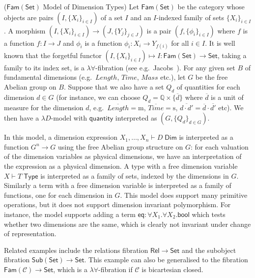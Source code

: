 \documentclass[a4paper,UKenglish]{lipics}
\newcommand{\msf}[1]{\mathsf{#1}} %
\newcommand{\Set}{\msf{Set}}
\newcommand{\Fam}[1]{\msf{Fam}(#1)}
\newcommand{\Sub}[1]{\msf{Sub}(#1)}
\newcommand{\Rel}{\msf{Rel}}
\newcommand{\C}{\mathcal{C}}
\newcommand{\bbQ}{\mathbb{Q}}
\newcommand{\qnt}{\msf{quantity}}
\newcommand{\bool}{\msf{bool}}
\newcommand{\lengthDim}{\mathit{Length}}
\newcommand{\timeDim}{\mathit{Time}}
\newcommand{\massDim}{\mathit{Mass}}
\newcommand{\Tj}[2]{#1 \vdash #2 \; \msf{ Type}}
\newcommand{\Dj}[2]{#1 \vdash #2 \; \msf{ Dim}}
\newcommand{\Dim}{D}
\newcommand{\Dvar}{X}
\begin{document}
\begin{example}($\Fam\Set$ Model of Dimension Types)
\label{example:famset}
Let $\Fam\Set$ be the category whose objects are pairs
$(I,\{X_i\}_{i\in I})$ of a set $I$ and an $I$-indexed family of sets
$\{X_i\}_{i\in I}$. A morphism $(I,\{X_i\}_{i\in I}) \to
(J,\{Y_j\}_{j\in J})$ is a pair $(f,\{\phi_i\}_{i\in I})$ where $f$ is
a function $f:I\to J$ and $\phi_i$ is a function $\phi_i:X_i\to
Y_{f(i)}$ for all $i\in I$. It is well known that the forgetful
functor $(I,\{X_i\}_{i\in I}) \mapsto I : \Fam\Set\to \Set$, taking a
family to its index set, is a $\lambda\forall$-fibration (see e.g.\
Jacobs~\cite[Lemma 1.9.5]{jacobs1999categorical}).  For any given set
$B$ of fundamental dimensions (e.g.\ $\lengthDim$, $\timeDim$, $\massDim$ etc.), let $G$ be
the free Abelian group on $B$. Suppose that we also have a set $Q_d$
of quantities for each dimension $d \in G$ (for instance, we can
choose $Q_d = \bbQ \times \{ \overline{d} \}$ where $\overline{d}$ is
a unit of measure for the dimension $d$, e.g.\
$\overline{\lengthDim} = \mathrm m$, $\overline{\timeDim} = \mathrm s$,
$\overline{d\cdot d'} = \overline{d}\cdot\overline{d'}$ etc). We then
have a $\lambda D$-model with $\qnt$ interpreted as $(G,\{Q_d\}_{d\in
  G})$.

In this model, a dimension expression $\Dj{\Dvar_1,\dots, \Dvar_n}
\Dim$ is interpreted as a function $G^n\to G$ using the free Abelian
group structure on $G$: for each valuation of the dimension variables
as physical dimensions, we have an interpretation of the expression as
a physical dimension. A type with a free dimension variable $\Tj \Dvar
T$ is interpreted as a family of sets, indexed by the dimensions in
$G$. Similarly a term with a free dimension variable is interpreted as
a family of functions, one for each dimension in $G$. This model does
support many primitive operations, but it does not support dimension
invariant polymorphism. For instance, the model supports adding a term
$\mathsf{eq}:\forall \Dvar_1.\forall \Dvar_2.\bool$ which tests
whether two dimensions are the same, which is clearly not invariant
under change of representation.

Related examples include the relations fibration $\Rel \to \Set$ and
the subobject fibration $\Sub{\Set} \to \Set$. This example can also
be generalised to the fibration $\Fam{\C}\to\Set$, which is a
$\lambda\forall$-fibration if $\C$ is bicartesian closed.

\end{example}
\end{document}
